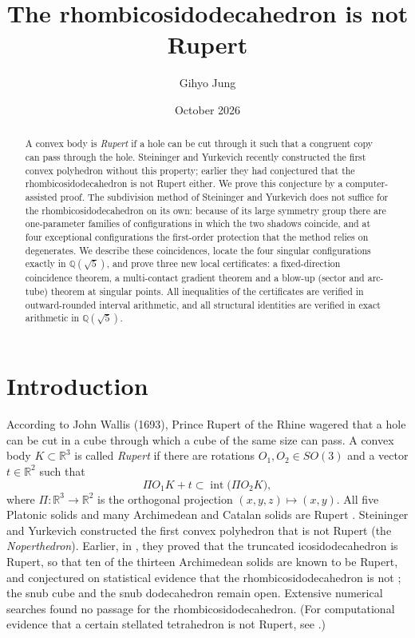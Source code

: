 \documentclass[11pt]{amsart}
\title{The rhombicosidodecahedron is not Rupert}
\author{Gihyo Jung}
\date{October 2026}
\theoremstyle{definition}
\newcommand{\R}{\mathbb{R}}
\newcommand{\Q}{\mathbb{Q}}
\newcommand{\sq}{\sqrt5}
\newcommand{\Prj}{\Pi}
\begin{document}
\begin{abstract}
A convex body is \emph{Rupert} if a hole can be cut through it such that a congruent copy can pass through the hole.
Steininger and Yurkevich recently constructed the first convex polyhedron without this property; earlier they had
conjectured that the rhombicosidodecahedron is not Rupert either. We prove this conjecture by a computer-assisted proof.
The subdivision method of Steininger and Yurkevich does not suffice for the rhombicosidodecahedron on its own:
because of its large symmetry group there are one-parameter families of configurations in which the two shadows
coincide, and at four exceptional configurations the first-order protection that the method relies on degenerates.
We describe these coincidences, locate the four singular configurations exactly in $\Q(\sq)$, and prove three new
local certificates: a fixed-direction coincidence theorem, a multi-contact gradient theorem and a blow-up
(sector and arc-tube) theorem at singular points. All inequalities of the certificates are verified in outward-rounded
interval arithmetic, and all structural identities are verified in exact arithmetic in $\Q(\sq)$.
\end{abstract}

\maketitle


\section{Introduction}\label{sec:intro}

According to John Wallis (1693), Prince Rupert of the Rhine wagered that a hole can be cut in a cube through which a
cube of the same size can pass. A convex body $K\subset\R^3$ is called \emph{Rupert} if there are rotations $O_1,O_2\in SO(3)$ and
a vector $t\in\R^2$ such that
\begin{equation}\label{eq:rupert}
  \Prj O_1 K + t \subset \operatorname{int}\bigl(\Prj O_2 K\bigr),
\end{equation}
where $\Prj:\R^3\to\R^2$ is the orthogonal projection $(x,y,z)\mapsto(x,y)$. All five Platonic solids and many
Archimedean and Catalan solids are Rupert \cite{JWY17,Chai18,Hoff19,Lav22,Fre21}. Steininger and Yurkevich \cite{SY25}
constructed the first convex polyhedron that is not Rupert (the \emph{Noperthedron}). Earlier, in \cite{SY21},
they proved that the truncated icosidodecahedron is Rupert, so that ten of the thirteen Archimedean solids are known
to be Rupert, and conjectured on statistical evidence that the rhombicosidodecahedron is not \cite[Conjecture 2]{SY21};
the snub cube and the snub dodecahedron remain open.
Extensive numerical searches \cite{SY21,Gos25} found no passage for the rhombicosidodecahedron. (For computational
evidence that a certain stellated tetrahedron is not Rupert, see \cite{Zeng26}.)
\end{document}
